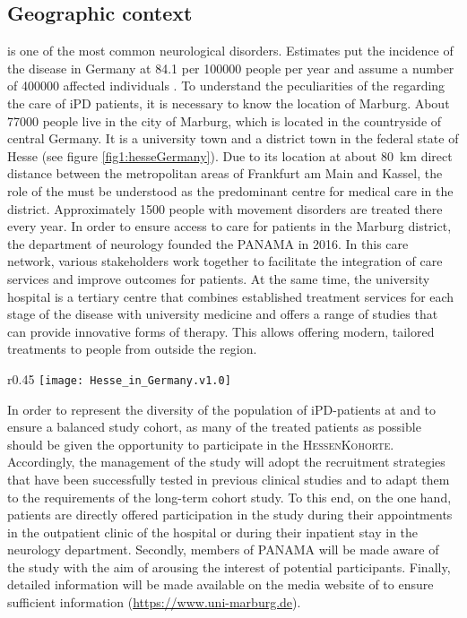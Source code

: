 \subsection{Geographic context}
 is one of the most common neurological disorders. Estimates put the incidence of the disease in Germany at \SI[round-precision = 1]{84.1}{} per \num[round-precision = 0, round-mode = places]{100000}{} people per year and assume a number of \num[round-precision = 0, round-mode = places]{400000}{} affected individuals \citep{nerius2017parkinson}. To understand the peculiarities of the \UKM{} regarding the care of \ac{iPD} patients, it is necessary to know the location of Marburg. About \SI[round-precision = 0, round-mode=places]{77000}{} people live in the city of Marburg, which is located in the countryside of central Germany. It is a university town and a district town in the federal state of Hesse (see figure \ref{fig1:hesseGermany}). Due to its location at about 80~km direct distance between the metropolitan areas of Frankfurt am Main and Kassel, the role of the \UKM{} must be understood as the predominant centre for medical care in the district. Approximately \num[round-precision = 0, round-mode = places]{1500}{} people with movement disorders are treated there every year. In order to ensure access to care for patients in the Marburg district, the department of neurology founded the \ac{PANAMA} in 2016. In this care network, various stakeholders work together to facilitate the integration of care services and improve outcomes for patients. At the same time, the university hospital is a tertiary centre that combines established treatment services for each stage of the disease with university medicine and offers a range of studies that can provide innovative forms of therapy. This allows offering modern, tailored treatments to people from outside the region.

\begin{wrapfigure}{r}{0.45\textwidth}
    \centering
    \texttt{[image: Hesse\_in\_Germany.v1.0]}
    \caption{Location of Hesse in the German Federal Republic}
    \label{fig1:hesseGermany}
\end{wrapfigure}

In order to represent the diversity of the population of \ac{iPD}-patients at \UKM{} and to ensure a balanced study cohort, as many of the treated patients as possible should be given the opportunity to participate in the \textsc{HessenKohorte}. Accordingly, the management of the study will adopt the recruitment strategies that have been successfully tested in previous clinical studies and to adapt them to the requirements of the long-term cohort study. To this end, on the one hand, patients are directly offered participation in the study during their appointments in the outpatient clinic of the hospital or during their inpatient stay in the neurology department. Secondly, members of \ac{PANAMA} will be made aware of the study with the aim of arousing the interest of potential participants. Finally, detailed information will be made available on the media website of \UKM{} to ensure sufficient information (\url{https://www.uni-marburg.de}).
\newpage

